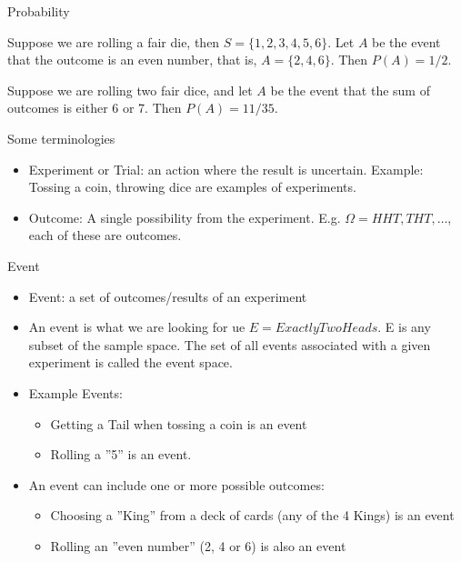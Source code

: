 \begin{frame}{Probability} 
\begin{example}
Suppose we are rolling a fair die, then $S=\{1,2,3,4,5,6\}$.  Let $A$ be the event that the outcome is an even number, that is, $A=\{2,4,6\}$.  Then $P(A)= 1/2$.
\end{example}

\begin{example}
Suppose we are rolling two fair dice, and let $A$ be the event that the sum of outcomes is either 6 or 7.  Then $P(A)= 11/35$.
\end{example}
\end{frame}

\begin{frame}{Some terminologies }
\begin{itemize}
\item Experiment or Trial: an action where the result is uncertain. Example: Tossing a coin, throwing dice are examples of experiments. 
\item Outcome: A single possibility from the experiment. E.g. $\Omega = {HHT, THT, \ldots}$, each of these are outcomes.
\end{itemize}
\end{frame}

\begin{frame}{Event}
\begin{itemize}
\item Event: a set of outcomes/results of an experiment 
 \item An event is what we are looking for ue $E={ExactlyTwoHeads}$. E is any subset of the sample space. The set of all events associated with a given
experiment is called the event space.
\item Example Events: 
\begin{itemize}
\item Getting a Tail when tossing a coin is an event 

\item Rolling a ''5'' is an event. 
\end{itemize}
\item An event can include one or more possible outcomes: 
\begin{itemize}
\item Choosing a ''King'' from a deck of cards (any of the 4 Kings) is an 
event 
\item Rolling an ''even number'' (2, 4 or 6) is also an event 
\end{itemize}
\end{itemize}
\end{frame}

